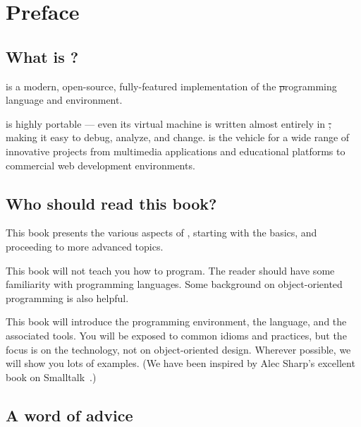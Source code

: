 \documentclass[a4paper,10pt,twoside]{book}
\begin{document}
	\renewcommand{\nnbb}[2]{} %
	\frontmatter
\fi
\chapter{Preface}\label{cha:intro}

\section*{What is \sq?}

\sq is a modern, open-source, fully-featured implementation of the \st programming language and environment.

\sq is highly portable --- even its virtual machine is written almost entirely in \st, making it easy to debug, analyze, and change.
\sq is the vehicle for a wide range of innovative projects from multimedia applications and educational platforms to commercial web development environments. 

\section*{Who should read this book?}

This book presents the various aspects of \sq, starting with the basics, and proceeding to more advanced topics.

This book will not teach you how to program.
The reader should have some familiarity with programming languages.
Some background on object-oriented programming is also helpful.

This book will introduce the \sq programming environment, the language, and the associated tools.
You will be exposed to common idioms and practices, but the focus is on the technology, not on object-oriented design.
Wherever possible, we will show you lots of examples.
(We have been inspired by Alec Sharp's excellent book on Smalltalk~\cite{Shar97a}.)

\ifluluelse{}{\newpage} %
\section*{A word of advice}

\end{document}
